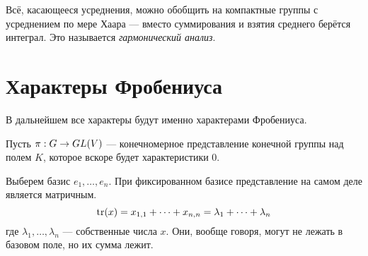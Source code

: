 Всё, касающееся усреднения, можно обобщить на компактные группы с усреднением по мере Хаара --- вместо суммирования и взятия среднего берётся интеграл.
Это называется \emph{гармонический анализ}.


\section{Характеры Фробениуса}
В дальнейшем все характеры будут именно характерами Фробениуса.

Пусть $\pi: G \rightarrow GL(V)$ --- конечномерное представление конечной группы над полем $K$, которое вскоре будет характеристики 0.

Выберем базис $e_1, \dots, e_n$.
При фиксированном базисе представление на самом деле является матричным.
\[\operatorname{tr}(x) = x_{1,1} + \dots + x_{n,n} = \lambda_1 + \dots + \lambda_n\]
где $\lambda_1, \dots, \lambda_n$ --- собственные числа $x$.
Они, вообще говоря, могут не лежать в базовом поле, но их сумма лежит.


